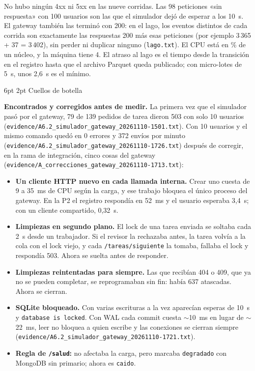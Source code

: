\documentclass[10pt,letterpaper]{article}
\makeatletter
\newcommand{\ev}[1]{{\footnotesize\texttt{evidence/\allowbreak #1}}}
\renewcommand\subsection{\@startsection{subsection}{2}{\z@}%
  {6pt \@plus 1pt}{2pt}%
  {\normalfont\normalsize\bfseries\color{acc}}}
\makeatother
\begin{document}
No hubo ningún 4xx ni 5xx en las nueve corridas. Las 98 peticiones «sin respuesta» con 100 usuarios son
las que el simulador dejó de esperar a los 10~s. El gateway también las terminó con 200: en el lago, los
eventos distintos de cada corrida son exactamente las respuestas 200 más esas peticiones (por ejemplo
3\,365 + 37 = 3\,402), sin perder ni duplicar ninguno (\texttt{lago.txt}). El CPU está en \% de un núcleo,
y la máquina tiene 4. El atraso al lago es el tiempo desde la transición en el registro hasta que el
archivo Parquet queda publicado; con micro-lotes de 5~s, unos 2,6~s es el mínimo.

\subsection{Cuellos de botella}

\textbf{Encontrados y corregidos antes de medir.} La primera vez que el simulador pasó por el gateway, 79
de 139 pedidos de tarea dieron 503 con solo 10 usuarios (\ev{A6.2\_simulador\_gateway\_20261110-1501.txt}).
Con 10 usuarios y el mismo comando quedó en 0 errores y 372 envíos por minuto
(\ev{A6.2\_simulador\_gateway\_20261110-1726.txt}) después de corregir, en la rama de integración, cinco
cosas del gateway (\ev{A\_correcciones\_gateway\_20261110-1713.txt}):
\begin{itemize}\setlength{\itemsep}{1pt}
\item \textbf{Un cliente HTTP nuevo en cada llamada interna.} Crear uno cuesta de 9 a 35~ms de CPU según la
carga, y ese trabajo bloquea el único proceso del gateway. En la P2 el registro respondía en 52~ms y el
usuario esperaba 3,4~s; con un cliente compartido, 0,32~s.
\item \textbf{Limpiezas en segundo plano.} El lock de una tarea enviada se soltaba cada 2~s desde un
trabajador. Si el revisor la rechazaba antes, la tarea volvía a la cola con el lock viejo, y cada
\texttt{/tareas/siguiente} la tomaba, fallaba el lock y respondía 503. Ahora se suelta antes de responder.
\item \textbf{Limpiezas reintentadas para siempre.} Las que recibían 404 o 409, que ya no se pueden completar,
se reprogramaban sin fin: había 637 atascadas. Ahora se cierran.
\item \textbf{SQLite bloqueado.} Con varias escrituras a la vez aparecían esperas de 10~s y
\texttt{database is locked}. Con WAL cada commit cuesta $\sim$10~ms en lugar de $\sim$22~ms, leer no bloquea a
quien escribe y las conexiones se cierran siempre (\ev{A6.2\_simulador\_gateway\_20261110-1721.txt}).
\item \textbf{Regla de \texttt{/salud}:} no afectaba la carga, pero marcaba \texttt{degradado} con MongoDB
sin primario; ahora es \texttt{caido}.
\end{itemize}
\end{document}
